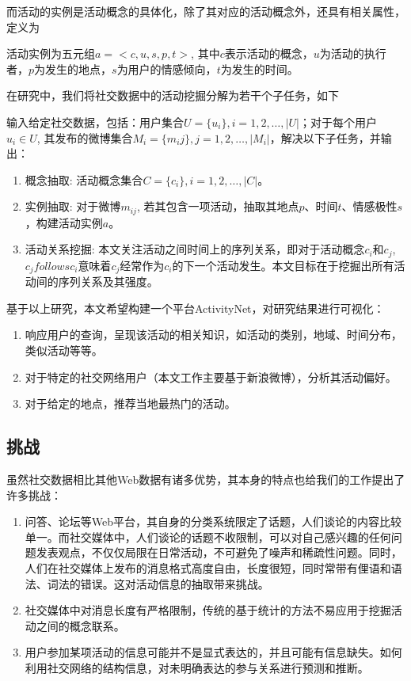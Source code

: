 而活动的实例是活动概念的具体化，除了其对应的活动概念外，还具有相关属性，定义为
\begin{definition}
活动实例为五元组$a=<c, u, s, p, t>$, 其中$c$表示活动的概念，$u$为活动的执行者，$p$为发生的地点，$s$为用户的情感倾向，$t$为发生的时间。
\end{definition}

在研究中，我们将社交数据中的活动挖掘分解为若干个子任务，如下

\begin{problem}[活动抽取与关系挖掘] 输入给定社交数据，包括：用户集合$U=\{u_i\}, i=1,2,\ldots,|U|$；对于每个用户$u_i \in U$, 其发布的微博集合$M_i=\{m_ij\}, j=1,2,\ldots,|M_i|$，解决以下子任务，并输出：

\begin{enumerate}
\item {\heiti 概念抽取:} 活动概念集合$C=\{c_i\}, i=1,2,\ldots, |C|$。
\item {\heiti 实例抽取:} 对于微博$m_{ij}$, 若其包含一项活动，抽取其地点$p$、时间$t$、情感极性$s$，构建活动实例$a$。
\item {\heiti 活动关系挖掘:} 本文关注活动之间时间上的序列关系，即对于活动概念$c_i$和$c_j$, $c_j follows c_i$意味着$c_j$经常作为$c_i$的下一个活动发生。本文目标在于挖掘出所有活动间的序列关系及其强度。
\end{enumerate}
\end{problem}

基于以上研究，本文希望构建一个平台ActivityNet，对研究结果进行可视化：
\begin{enumerate}
\item 响应用户的查询，呈现该活动的相关知识，如活动的类别，地域、时间分布，类似活动等等。
\item 对于特定的社交网络用户（本文工作主要基于新浪微博），分析其活动偏好。
\item 对于给定的地点，推荐当地最热门的活动。
\end{enumerate}

\subsection{挑战}

虽然社交数据相比其他Web数据有诸多优势，其本身的特点也给我们的工作提出了许多挑战：

\begin{enumerate}
\item 问答、论坛等Web平台，其自身的分类系统限定了话题，人们谈论的内容比较单一。而社交媒体中，人们谈论的话题不收限制，可以对自己感兴趣的任何问题发表观点，不仅仅局限在日常活动，不可避免了噪声和稀疏性问题。同时，人们在社交媒体上发布的消息格式高度自由，长度很短，同时常带有俚语和语法、词法的错误。这对活动信息的抽取带来挑战。
\item 社交媒体中对消息长度有严格限制，传统的基于统计的方法不易应用于挖掘活动之间的概念联系。
\item 用户参加某项活动的信息可能并不是显式表达的，并且可能有信息缺失。如何利用社交网络的结构信息，对未明确表达的参与关系进行预测和推断。
\end{enumerate}

